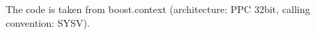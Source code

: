 \newpage
{}\label{appendixb}

The code is taken from boost.context\cite{bcontext} (architecture: PPC 32bit,
calling convention: SYSV).

